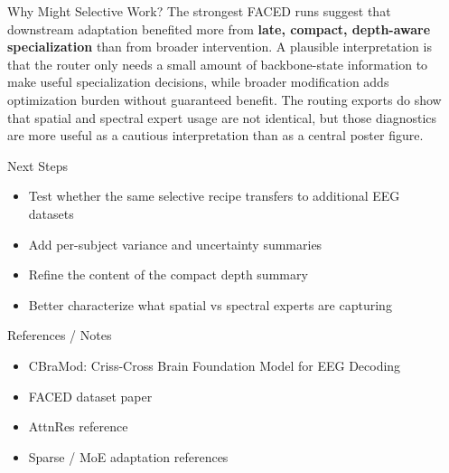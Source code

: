 \documentclass[final]{beamer}
\newlength{\sepwidth}
\newlength{\colwidth}
\newcommand{\separatorcolumn}{\begin{column}{\sepwidth}\end{column}}
\begin{document}
\begin{frame}[t]
\begin{columns}[t]
\begin{column}{\colwidth}
  \begin{block}{Why Might Selective Work?}
    \small
    The strongest FACED runs suggest that downstream adaptation benefited more
    from \textbf{late, compact, depth-aware specialization} than from broader
    intervention. A plausible interpretation is that the router only needs a
    small amount of backbone-state information to make useful specialization
    decisions, while broader modification adds optimization burden without
    guaranteed benefit. The routing exports do show that spatial and spectral
    expert usage are not identical, but those diagnostics are more useful as a
    cautious interpretation than as a central poster figure.
  \end{block}

  \begin{block}{Next Steps}
    \small
    \begin{itemize}
      \item Test whether the same selective recipe transfers to additional EEG
      datasets
      \item Add per-subject variance and uncertainty summaries
      \item Refine the content of the compact depth summary
      \item Better characterize what spatial vs spectral experts are capturing
    \end{itemize}
  \end{block}

  \begin{block}{References / Notes}
    \small
    \begin{itemize}
      \item CBraMod: Criss-Cross Brain Foundation Model for EEG Decoding
      \item FACED dataset paper
      \item AttnRes reference
      \item Sparse / MoE adaptation references
    \end{itemize}
  \end{block}

\end{column}

\separatorcolumn
\end{columns}
\end{frame}
\end{document}
